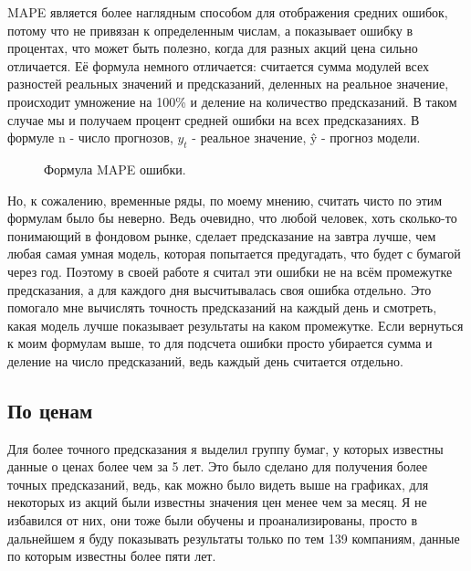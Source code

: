 \documentclass[12pt, a4paper]{article}
\begin{document}
MAPE  является более наглядным способом для отображения средних ошибок, потому что не привязан к определенным числам, а показывает ошибку в процентах, что может быть полезно, когда для разных акций цена сильно отличается. Её формула немного отличается: считается сумма модулей всех разностей реальных значений и предсказаний, деленных на реальное значение, происходит умножение на 100\% и деление на количество предсказаний. В таком случае мы и получаем процент средней ошибки на всех предсказаниях. В формуле n - число прогнозов, $y_t$ - реальное значение, \^{y} - прогноз модели.
\begin{figure}[!h]
\caption{Формула MAPE ошибки.}
\label{fig:mape}
\end{figure}

Но, к сожалению, временные ряды, по моему мнению, считать чисто по этим формулам было бы неверно. Ведь очевидно, что любой человек, хоть сколько-то понимающий в фондовом рынке, сделает предсказание на завтра лучше, чем любая самая умная модель, которая попытается предугадать, что будет с бумагой через год. Поэтому в своей работе я считал эти ошибки не на всём промежутке предсказания, а для каждого дня высчитывалась своя ошибка отдельно. Это помогало мне вычислять точность предсказаний на каждый день и смотреть, какая модель лучше показывает результаты на каком промежутке. Если вернуться к моим формулам выше, то для подсчета ошибки просто убирается сумма и деление на число предсказаний, ведь каждый день считается отдельно.

\subsection{По ценам}

Для более точного предсказания я выделил группу бумаг, у которых известны данные о ценах более чем за 5 лет. Это было сделано для получения более точных предсказаний, ведь, как можно было видеть выше на графиках, для некоторых из акций были известны значения цен менее чем за месяц. Я не избавился от них, они тоже были обучены и проанализированы, просто в дальнейшем я буду показывать результаты только по тем 139 компаниям, данные по которым известны более пяти лет.
\end{document}
